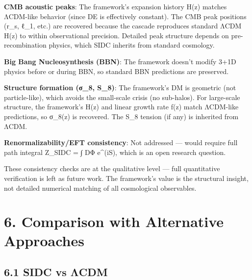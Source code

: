 \documentclass[11pt,a4paper]{article}
\begin{document}
\textbf{CMB acoustic peaks}: The framework's expansion history H(z)
matches ΛCDM-like behavior (since DE is effectively constant). The CMB
peak positions (r\_s, ℓ\_1, etc.) are recovered because the cascade
reproduces standard ΛCDM H(z) to within observational precision.
Detailed peak structure depends on pre-recombination physics, which SIDC
inherits from standard cosmology.

\textbf{Big Bang Nucleosynthesis (BBN)}: The framework doesn't modify
3+1D physics before or during BBN, so standard BBN predictions are
preserved.

\textbf{Structure formation (σ\_8, S\_8)}: The framework's DM is
geometric (not particle-like), which avoids the small-scale crisis (no
sub-halos). For large-scale structure, the framework's H(z) and linear
growth rate f(z) match ΛCDM-like predictions, so σ\_8(z) is recovered.
The S\_8 tension (if any) is inherited from ΛCDM.

\textbf{Renormalizability/EFT consistency}: Not addressed --- would
require full path integral Z\_SIDC = ∫ DΦ e\^{}(iS), which is an open
research question.

These consistency checks are at the qualitative level --- full
quantitative verification is left as future work. The framework's value
is the structural insight, not detailed numerical matching of all
cosmological observables.

\hypertarget{comparison-with-alternative-approaches}{%
\section{6. Comparison with Alternative
Approaches}\label{comparison-with-alternative-approaches}}

\hypertarget{sidc-vs-ux3bbcdm}{%
\subsection{6.1 SIDC vs ΛCDM}\label{sidc-vs-ux3bbcdm}}
\end{document}
